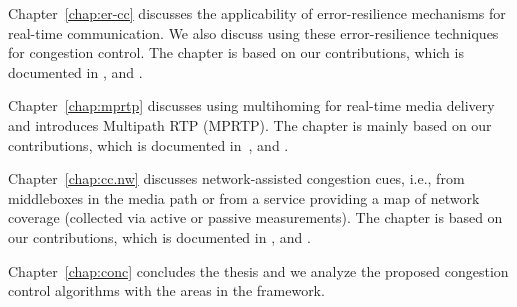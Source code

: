 
Chapter~\ref{chap:er-cc} discusses the applicability of error-resilience
mechanisms for real-time communication. We also discuss using these
error-resilience techniques for congestion control. The chapter is based on
our contributions, which is documented in , and
.


Chapter~\ref{chap:mprtp} discusses using multihoming for real-time media
delivery and introduces Multipath RTP (MPRTP). The chapter is mainly based on
our contributions, which is documented in~\cite{draft.mprtp, draft.mprtp.sdp,
Globisch:AsymGrpComm, draft.rtcp.overlay}, and .



Chapter~\ref{chap:cc.nw} discusses network-assisted congestion cues, i.e.,
from middleboxes in the media path or from a service providing a map of
network coverage (collected via active or passive measurements). The chapter
is based on our contributions, which is documented in ,
 and \cite{glass:patent}.


Chapter~\ref{chap:conc} concludes the thesis and we analyze the proposed
congestion control algorithms with the areas in the framework.
